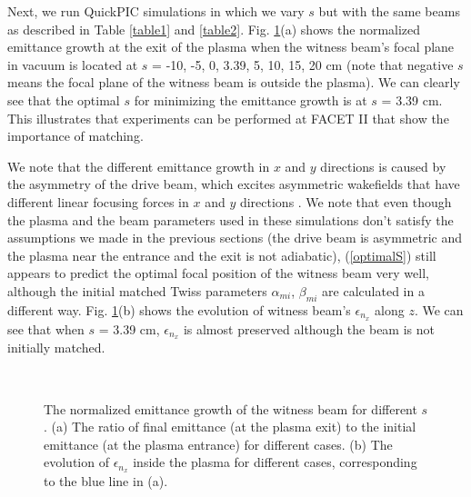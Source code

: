 \documentclass[%
reprint, superscriptaddress,
 amsmath,amssymb, aps,
prstab,
]{revtex4-2}
\begin{document}
Next, we run QuickPIC simulations in which we vary $s$ but with the
same beams as described in Table \ref{table1} and \ref{table2}. Fig.
\ref{fig:emittance_increment}(a) shows the normalized emittance growth at the
exit of the plasma when the witness beam's focal plane in vacuum is
located at $s$ = -10, -5, 0, 3.39, 5, 10, 15, 20 cm (note that
negative $s$ means the focal plane of the witness beam is outside the
plasma).
We can clearly see that the optimal $s$ for minimizing the emittance growth
is at $s$ = 3.39 cm. This illustrates that experiments can be performed at FACET II that show the importance of matching.


We note that the different emittance growth in $x$
and $y$ directions is caused by the asymmetry of the drive beam, which excites asymmetric wakefields that
have different linear focusing forces in $x$ and $y$ directions
\cite{Lance}. We note that even though the plasma and the beam parameters used in these simulations don't satisfy the assumptions we made in the previous sections (the drive beam is asymmetric and the plasma near the entrance and the exit is not adiabatic), (\ref{optimalS}) still appears to predict the optimal focal position of the witness beam very well, although the initial matched Twiss parameters $\alpha_{mi}$, $\beta_{mi}$ are calculated in a different way.
Fig. \ref{fig:emittance_increment}(b) shows the evolution of witness beam's $\epsilon_{n_x}$ along $z$. We can see that when $s$ = 3.39 cm, $\epsilon_{n_x}$ is almost preserved although the beam is not initially matched.



\begin{figure} 
    \\
    \caption{The normalized emittance growth of the witness beam for
    different $s$. (a) The ratio of final emittance (at the plasma exit)
    to the initial emittance (at the plasma entrance) for different
    cases. (b) The evolution of $\epsilon_{n_x}$ inside the plasma for
    different cases, corresponding to the blue line in (a).}
    \label{fig:emittance_increment} 
\end{figure}
\end{document}
